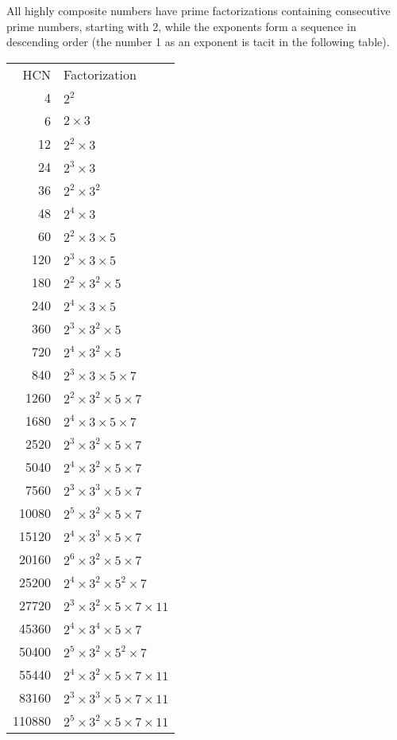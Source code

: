 \documentclass[12pt]{article}
\begin{document}
All highly composite numbers have prime factorizations containing consecutive prime numbers, starting with 2, while the exponents form a sequence in descending order (the number 1 as an exponent is tacit in the following table).

\begin{tabular}{|r|l|}
HCN & Factorization \\
4 & $2^2$ \\
6 & $2 \times 3$ \\
12 & $2^2 \times 3$ \\
24 & $2^3 \times 3$ \\
36 & $2^2 \times 3^2$ \\
48 & $2^4 \times 3$ \\
60 & $2^2 \times 3 \times 5$ \\
120 & $2^3 \times 3 \times 5$ \\
180 & $2^2 \times 3^2 \times 5$ \\
240 & $2^4 \times 3 \times 5$ \\
360 & $2^3 \times 3^2 \times 5$ \\
720 & $2^4 \times 3^2 \times 5$ \\
840 & $2^3 \times 3 \times 5 \times 7$ \\
1260 & $2^2 \times 3^2 \times 5 \times 7$ \\
1680 & $2^4 \times 3 \times 5 \times 7$ \\
2520 & $2^3 \times 3^2 \times 5 \times 7$ \\
5040 & $2^4 \times 3^2 \times 5 \times 7$ \\
7560 & $2^3 \times 3^3 \times 5 \times 7$ \\
10080 & $2^5 \times 3^2 \times 5 \times 7$ \\
15120 & $2^4 \times 3^3 \times 5 \times 7$ \\
20160 & $2^6 \times 3^2 \times 5 \times 7$ \\
25200 & $2^4 \times 3^2 \times 5^2 \times 7$ \\
27720 & $2^3 \times 3^2 \times 5 \times 7 \times 11$ \\
45360 & $2^4 \times 3^4 \times 5 \times 7$ \\
50400 & $2^5 \times 3^2 \times 5^2 \times 7$ \\
55440 & $2^4 \times 3^2 \times 5 \times 7 \times 11$ \\
83160 & $2^3 \times 3^3 \times 5 \times 7 \times 11$ \\
110880 & $2^5 \times 3^2 \times 5 \times 7 \times 11$ \\

\end{tabular}
\end{document}
